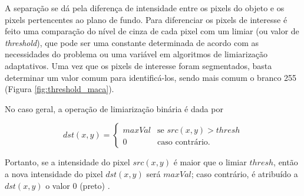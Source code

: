 A separação se dá pela diferença de intensidade entre os pixels do objeto e os pixels pertencentes ao plano de fundo. Para diferenciar os pixels de interesse é feito uma comparação do nível de cinza de cada pixel com um limiar (ou valor de \textit{threshold}), que pode ser uma constante determinada de acordo com as necessidades do problema ou uma variável em algoritmos de limiarização adaptativos. Uma vez que os pixels de interesse foram segmentados, basta determinar um valor comum para identificá-los, sendo mais comum o branco 255 (Figura \ref{fig:threshold_maca}).

No caso geral, a operação de limiarização binária é dada por

\begin{equation}
  dst(x,y)=\begin{cases}
    maxVal & \text{se $src(x,y) > thresh$}\\
    0 & \text{caso contrário.}
  \end{cases}
\end{equation}

\noindent Portanto, se a intensidade do pixel $src(x,y)$ é maior que o limiar $thresh$, então a nova intensidade do pixel $dst(x,y)$ será $maxVal$; caso contrário, é atribuído a $dst(x,y)$ o valor 0 (preto) \citep{opencv:2008:book}.








